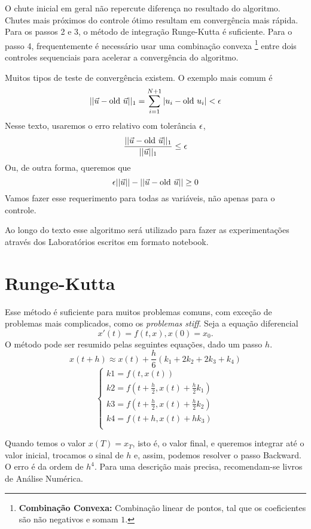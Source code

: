 O chute inicial em geral não repercute diferença no resultado do algoritmo.
Chutes mais próximos do controle ótimo resultam em convergência mais rápida.
Para os passos 2 e 3, o método de integração Runge-Kutta é suficiente. Para o
passo 4, frequentemente é necessário usar uma combinação convexa 
\footnote{\textbf{Combinação Convexa:} Combinação linear de pontos, tal que os
coeficientes são não negativos e somam $1$.} entre dois controles
sequenciais para acelerar a convergência do algoritmo.

Muitos tipos de teste de convergência existem. O exemplo mais comum é
$$
||\vec{u} - \text{old }\vec{u}||_1 = \sum_{i=1}^{N+1} |u_i - \text{old }u_i| < \epsilon   
$$
Nesse texto, usaremos o erro relativo com tolerância $\epsilon$,
$$
\frac{||\vec{u} - \text{old }\vec{u}||_1}{||\vec{u}||_1} \le \epsilon 
$$
Ou, de outra forma, queremos que 
$$
\epsilon ||\vec{u}|| - ||\vec{u} - \text{old }\vec{u}|| \ge 0
$$
Vamos fazer esse requerimento para todas as variáveis, não apenas para o
controle. 

Ao longo do texto esse algoritmo será utilizado para fazer as experimentações
através dos Laboratórios escritos em formato notebook. 

\section{Runge-Kutta}

Esse método é suficiente para muitos problemas comuns, com exceção de
problemas mais complicados, como os \textit{problemas stiff}. Seja a equação
diferencial 
$$x'(t) = f(t,x), x(0) = x_0.$$ 
O método pode ser resumido pelas seguintes equações, dado um passo $h$. 
\begin{equation*}
    x(t + h) \approx x(t) + \frac{h}{6}(k_1 + 2k_2 + 2k_3 + k_4) 
\end{equation*}
\begin{equation*}
    \begin{cases}
    k1 = f(t,x(t)) \\
    k2 = f(t + \frac{h}{2},x(t) + \frac{h}{2}k_1) \\
    k3 = f(t + \frac{h}{2},x(t) + \frac{h}{2}k_2) \\
    k4 = f(t + h, x(t) + hk_3) \\
    \end{cases}
\end{equation*}

Quando temos o valor $x(T) = x_T$, isto é, o valor final, e queremos integrar
até o valor inicial, trocamos o sinal de $h$ e, assim, podemos resolver o
passo Backward. O erro é da ordem de $h^4$. Para uma descrição mais precisa,
recomendam-se livros de Análise Numérica. 